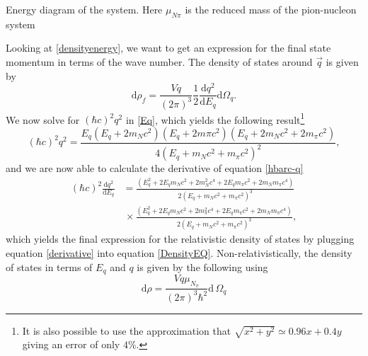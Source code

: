 \begin{marginfigure}
	\centering
	
	\caption{Energy diagram of the system. Here $\mu_{N\pi}$ is the reduced mass of the pion-nucleon system}
	\label{fig:qenergy}
\end{marginfigure}
Looking at \eqref{densityenergy}, we want to get an expression for the final state momentum in terms of the wave number. The density of states around $\vec{q}$ is given by
\begin{equation} \label{DensityEQ}
	\text{d}\rho_f = \frac{Vq}{(2\pi)^3}\frac{1}{2}\frac{\text{d}q^2}{\text{d}E_q} \text{d}\Omega_q.
\end{equation}
We now solve for $(\hbar c)^2q^2$ in \eqref{Eq}, which yields the following result\footnote{It is also possible to use the approximation that $\sqrt{x^2+y^2}\simeq 0.96x+0.4y$ giving an error of only $4\%$.}
\begin{equation} \label{hbarc-q}
	(\hbar c)^2 q^2 = \frac{E_q(E_q+2m_N c^2)(E_q+2m\pi c^2)(E_q+2m_N c^2+2m_\pi c^2)}{4(E_q+m_N c^2+m_\pi c^2)^2},
\end{equation}
and we are now able to calculate the derivative of equation \eqref{hbarc-q}
\begin{equation}\begin{split} \label{derivative}
		(\hbar c)^2\frac{\text{d}q^2}{\text{d}E_q} &= \frac{(E_q^2+2E_q m_N c^2+2m_N^2 c^4+2E_q m_\pi c^2+2m_N m_\pi c^4)}{2(E_q+m_N c^2+m_\pi c^2)^3} \\
		& \, \times \frac{(E_q^2+2E_q m_N c^2 +2m_\pi^2 c^4 +2E_q m_\pi c^2+2m_N m_\pi c^4)}{2(E_q+m_N c^2+m_\pi c^2)^3},
	\end{split}
\end{equation} 
which yields the final expression for the relativistic density of states by plugging equation \eqref{derivative} into equation \eqref{DensityEQ}. Non-relativistically, the density of states in terms of $E_q$ and $q$ is given by the following using 
\begin{equation}\label{nonreladensity}
	\text{d}\rho = \frac{Vq\mu_{N_\pi}}{(2\pi)^3\hbar^2} \text{d}\,\Omega_q
\end{equation}